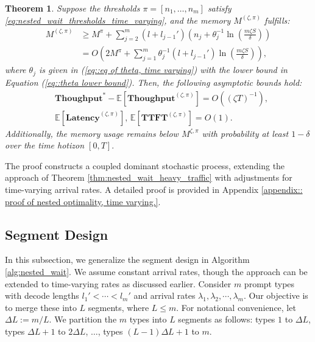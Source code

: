 \documentclass[preprint]{article}
\newcommand{\throughput}{\textbf{Thoughput}}
\newcommand{\Latency}{\textbf{Latency}}
\newcommand{\TTFT}{\textbf{TTFT}}
\theoremstyle{plain}
\newtheorem{theorem}{Theorem}[section]
\theoremstyle{definition}
\theoremstyle{remark}
\begin{document}
\begin{theorem}
\label{thm:nested_wait_heavy_traffic_time_varying}
Suppose the thresholds $\pi = [n_1, \dots, n_m]$ satisfy \eqref{eq:nested_wait_thresholds_time_varying}, and the memory $M^{(\zeta,\pi)}$ fulfills:
\[
\begin{aligned}
M^{(\zeta,\pi)}
&\geq M^{\pi} + \sum_{j=2}^m (l + l_{j-1}') \left(n_j + \theta_j^{-1} \ln\!\left( \tfrac{m \zeta S}{\delta} \right)\right) \\
&= O\!\left( 2M^\pi + \sum_{j=1}^m \theta_j^{-1}  (l + l_{j-1}') \ln\!\left( \tfrac{m \zeta S}{\delta} \right) \right),
\end{aligned}
\]
where $\theta_j$ is given in (\ref{eq::eq of theta, time varying}) with the lower bound in Equation (\ref{eq::theta lower bound}). Then, the following asymptotic bounds hold:
$$
    \begin{aligned}
        &\throughput^* - \mathbb{E}\left[ \throughput^{(\zeta, \pi)} \right] 
   = O\left( (\zeta T)^{-1} \right), \\
&\mathbb{E}\left[ \Latency^{(\zeta, \pi)} \right], \,\mathbb{E}\left[ \TTFT^{(\zeta, \pi)} \right] = O(1).
    \end{aligned}
$$
Additionally, the memory usage remains below $M^{\zeta,\pi}$ with probability at least $1 - \delta$ over the time hotizon $[0,T].$
\end{theorem}

The proof constructs a coupled dominant stochastic process, extending the approach of Theorem \ref{thm:nested_wait_heavy_traffic} with adjustments for time-varying arrival rates. A detailed proof is provided in Appendix \ref{appendix:: proof of nested optimality, time varying.}.

\subsection{Segment Design}

In this subsection, we generalize the segment design in Algorithm \ref{alg:nested_wait}. We assume constant arrival rates, though the approach can be extended to time-varying rates as discussed earlier. Consider $m$ prompt types with decode lengths $l_1' < \cdots < l_m'$ and arrival rates $\lambda_1, \lambda_2, \cdots, \lambda_m$. Our objective is to merge these into $L$ segments, where $L \leq m$. For notational convenience, let $\Delta L:= m/L$. We partition the $m$ types into $L$ segments as follows: types $1$ to $\Delta L$, types $\Delta L+ 1$ to $2\Delta L$, $\dots$, types $(L-1)\Delta L+ 1$ to $m$.
\end{document}
